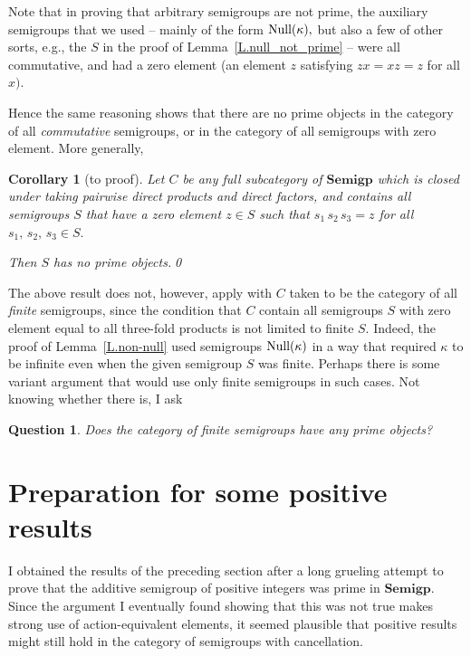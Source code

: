 \documentclass{amsart}
\newtheorem{corollary}[theorem]{Corollary}
\newtheorem{question}[theorem]{Question}
\numberwithin{equation}{section}
\numberwithin{theorem}{section}
\begin{document}
Note that in proving that arbitrary semigroups are not
prime, the auxiliary semigroups that we used -- mainly of
the form $\textup{Null}(\kappa),$ but also a few of other
sorts, e.g., the $S$ in the proof of Lemma~\ref{L.null_not_prime}
-- were all commutative, and had a zero element (an element
$z$ satisfying $zx=xz=z$ for all $x).$

Hence the same reasoning shows that there are no prime
objects in the category of all {\em commutative} semigroups,
or in the category of all semigroups with zero element.
More generally,

\begin{corollary}[to proof]\label{C.cm}
Let $C$ be any full subcategory of $\mathbf{Semigp}$
which is closed under taking pairwise direct products and
direct factors, and contains all semigroups $S$ that have a zero
element $z\in S$ such
that $s_1\,s_2\,s_3=z$ for all $s_1,\,s_2,\,s_3\in S.$

Then $S$ has no prime objects.\qed
\end{corollary}

The above result does not, however, apply with $C$ taken to be the
category of all {\em finite} semigroups, since the
condition that $C$ contain all semigroups $S$ with zero element
equal to all three-fold products is not limited to finite $S.$
Indeed, the proof of
Lemma~\ref{L.non-null} used semigroups $\textup{Null}(\kappa)$ in
a way that required $\kappa$ to be infinite even when the
given semigroup $S$ was finite.
Perhaps there is some variant argument that would use only
finite semigroups in such cases.
Not knowing whether there is, I ask

\begin{question}\label{Q.prime_in_fin}
Does the category of {\em finite} semigroups have any prime objects?
\end{question}

\section{Preparation for some positive results}\label{S.prep}

I obtained the results of the preceding section after a long
grueling attempt to prove that the additive semigroup of
positive integers was prime in $\mathbf{Semigp}.$
Since the argument I eventually found showing that this was not
true makes strong use of action-equivalent elements, it seemed plausible
that positive results might still hold in the category of semigroups
with cancellation.
\end{document}
